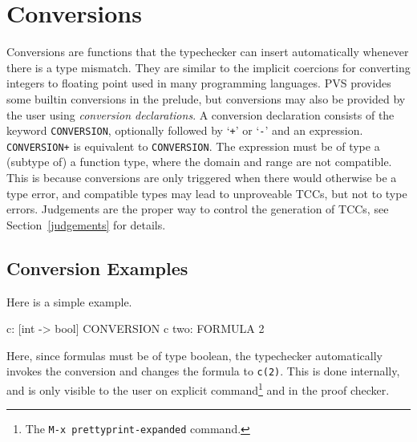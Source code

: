 \section{Conversions}
\label{coercion-decls}

Conversions are functions that the typechecker can insert automatically
whenever there is a type mismatch.  They are similar to the implicit
coercions for converting integers to floating point used in many
programming languages.  PVS provides some builtin conversions in the
prelude, but conversions may also be provided by the user using
\emph{conversion declarations}.  A conversion declaration consists of the
keyword \texttt{CONVERSION}, optionally followed by `\texttt{+}' or
`\texttt{-}' and an expression.  \texttt{CONVERSION+} is equivalent to
\texttt{CONVERSION}.  The expression must be of type a (subtype of) a
function type, where the domain and range are not compatible.  This is
because conversions are only triggered when there would otherwise be a
type error, and compatible types may lead to unproveable TCCs, but not to
type errors.  Judgements are the proper way to control the generation of
TCCs, see Section~\ref{judgements} for details.

\subsection{Conversion Examples}
\label{conversion-examples}

Here is a simple example.
\begin{pvsex}
  c: [int -> bool]
  CONVERSION c
  two: FORMULA 2
\end{pvsex}
Here, since formulas must be of type boolean, the typechecker
automatically invokes the conversion and changes the formula to
\texttt{c(2)}.  This is done internally, and is only visible to the user
on explicit command\footnote{The \texttt{M-x~prettyprint-expanded} command.}
and in the proof checker.

